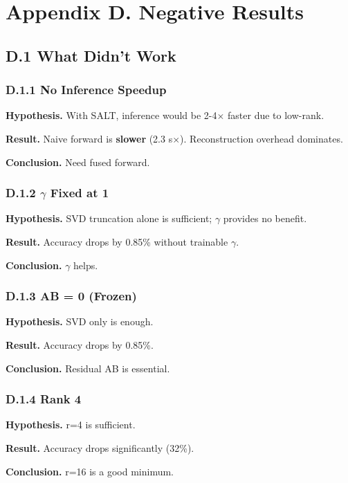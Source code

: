 \section{Appendix D. Negative Results}

\subsection{D.1 What Didn't Work}

\subsubsection{D.1.1 No Inference Speedup}

\textbf{Hypothesis.} With SALT, inference would be 2-4$\times$ faster due to low-rank.

\textbf{Result.} Naive forward is \textbf{slower} (2.3 s$\times$). Reconstruction 
overhead dominates.

\textbf{Conclusion.} Need fused forward.

\subsubsection{D.1.2 $\gamma$ Fixed at 1}

\textbf{Hypothesis.} SVD truncation alone is sufficient; $\gamma$ provides no benefit.

\textbf{Result.} Accuracy drops by 0.85\% without trainable $\gamma$.

\textbf{Conclusion.} $\gamma$ helps.

\subsubsection{D.1.3 AB = 0 (Frozen)}

\textbf{Hypothesis.} SVD only is enough.

\textbf{Result.} Accuracy drops by 0.85\%.

\textbf{Conclusion.} Residual AB is essential.

\subsubsection{D.1.4 Rank 4}

\textbf{Hypothesis.} r=4 is sufficient.

\textbf{Result.} Accuracy drops significantly (32\%).

\textbf{Conclusion.} r=16 is a good minimum.

